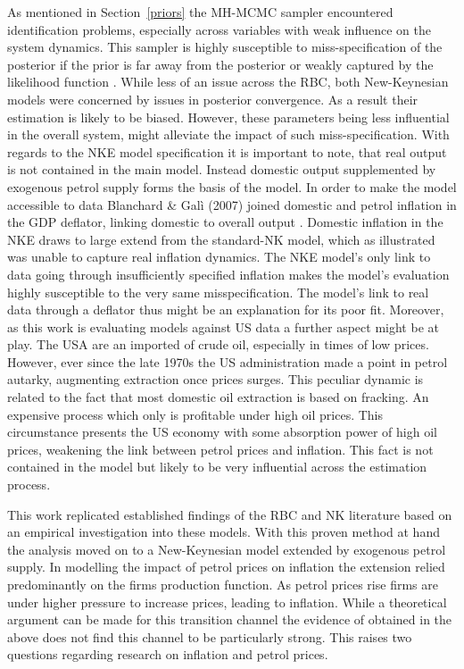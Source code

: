 \documentclass[12pt,a4paper,english]{article} %
\begin{document}
	As mentioned in Section~\ref{priors} the MH-MCMC sampler encountered identification problems, especially across variables with weak influence on the system dynamics. This sampler is highly susceptible to miss-specification of the posterior if the prior is far away from the posterior or weakly captured by the likelihood function \cite{herbst_bayesian_2016}. While less of an issue across the RBC, both New-Keynesian models were concerned by issues in posterior convergence. As a result their estimation is likely to be biased. However, these parameters being less influential in the overall system, might alleviate the impact of such miss-specification.
	With regards to the NKE model specification it is important to note, that real output is not contained in the main model. Instead domestic output supplemented by exogenous petrol supply forms the basis of the model. In order to make the model accessible to data Blanchard \& Galì (2007) joined domestic and petrol inflation in the GDP deflator, linking domestic to overall output \cite{blanchard_macroeconomic_2007}. Domestic inflation in the NKE draws to large extend from the standard-NK model, which as illustrated was unable to capture real inflation dynamics. The NKE model's only link to data going through insufficiently specified inflation makes the model's evaluation highly susceptible to the very same misspecification. The model's link to real data through a deflator thus might be an explanation for its poor fit.
	Moreover, as this work is evaluating models against US data a further aspect might be at play. The USA are an imported of crude oil, especially in times of low prices. However, ever since the late 1970s the US administration made a point in petrol autarky, augmenting extraction once prices surges. This peculiar dynamic is related to the fact that most domestic oil extraction is based on fracking. An expensive process which only is profitable under high oil prices. This circumstance presents the US economy with some absorption power of high oil prices, weakening the link between petrol prices and inflation. This fact is not contained in the model but likely to be very influential across the estimation process.
	
	This work replicated established findings of the RBC and NK literature based on an empirical investigation into these models. With this proven method at hand the analysis moved on to a New-Keynesian model extended by exogenous petrol supply. In modelling the impact of petrol prices on inflation the extension relied predominantly on the firms production function. As petrol prices rise firms are under higher pressure to increase prices, leading to inflation. While a theoretical argument can be made for this transition channel the evidence of obtained in the above does not find this channel to be particularly strong. This raises two questions regarding research on inflation and petrol prices.
	
\end{document}

